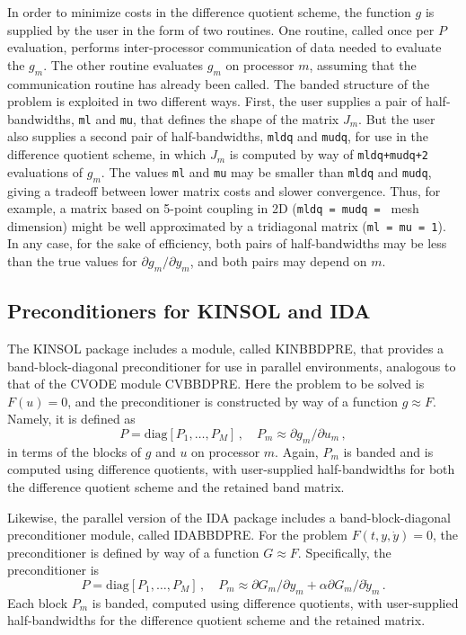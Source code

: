 In order to minimize costs in the difference quotient scheme, the
function $g$ is supplied by the user in the form of two routines.  One
routine, called once per $P$ evaluation, performs inter-processor
communication of data needed to evaluate the $g_m$.  The other routine
evaluates $g_m$ on processor $m$, assuming that the communication
routine has already been called.  The banded structure of the problem
is exploited in two different ways.  First, the user supplies a pair of
half-bandwidths, {\tt ml} and {\tt mu}, that defines the shape of the
matrix $J_m$.  But the user also supplies a second pair of
half-bandwidths, {\tt mldq} and {\tt mudq}, for use in the difference
quotient scheme, in which $J_m$ is computed by way of 
{\tt mldq+mudq+2} evaluations of $g_m$.  The values {\tt ml} and {\tt mu} 
may be smaller than {\tt mldq} and {\tt mudq}, giving a tradeoff between
lower matrix costs and slower convergence.  Thus, for example, a matrix 
based on 5-point coupling in
2D ({\tt mldq = mudq = } mesh dimension) might be well approximated by
a tridiagonal matrix ({\tt ml = mu = 1}).  In any case, for the sake
of efficiency, both pairs of half-bandwidths may be less than the true
values for $\partial g_m /\partial y_m$, and both pairs may depend on
$m$.

\subsection{Preconditioners for KINSOL and IDA}

The KINSOL package includes a module, called
KINBBDPRE, that provides a band-block-diagonal preconditioner
for use in parallel environments,
analogous to that of the CVODE module CVBBDPRE.  Here the problem to
be solved is $F(u) = 0$, and the preconditioner is constructed by way
of a function $g \approx F$.  Namely, it is defined as
\begin{equation*}
  P = \mbox{diag}[P_1,\ldots,P_M] \, , \quad
  P_m \approx \partial g_m / \partial u_m \, ,
\end{equation*}
in terms of the blocks of $g$ and $u$ on processor $m$.  Again, $P_m$
is banded and is computed using difference quotients, with user-supplied
half-bandwidths for both the difference quotient scheme and the
retained band matrix.

Likewise, the parallel version of the IDA package includes a
band-block-diagonal preconditioner module, called IDABBDPRE.  For the
problem $F(t,y,{\dot y}) = 0$, the preconditioner is defined by way of a
function $G \approx F$.  Specifically, the preconditioner is
\begin{equation*}
  P = \mbox{diag}[P_1,\ldots,P_M] \, ,
  \quad P_m \approx \partial G_m / \partial y_m
  + \alpha \partial G_m / \partial {\dot y}_m \, . 
\end{equation*}
Each block $P_m$ is banded, computed using difference quotients, with
user-supplied half-bandwidths for the difference quotient scheme and
the retained matrix.

